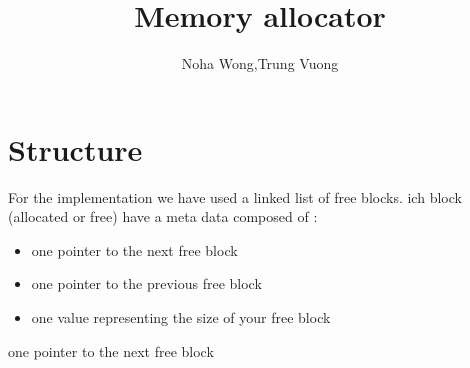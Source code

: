 \documentclass{article}
\title{Memory allocator}
\author{Noha Wong,Trung Vuong}
\begin{document}
\maketitle
\newpage

\part{Structure}

For the implementation we have used a linked list of free blocks.
ich block (allocated or free) have a meta data composed of :
\begin{itemize}
\item one pointer to the next free block
\item one pointer to the previous free block
\item one value representing the size of your free block
\end{itemize}one pointer to the next free block
\end{document}
